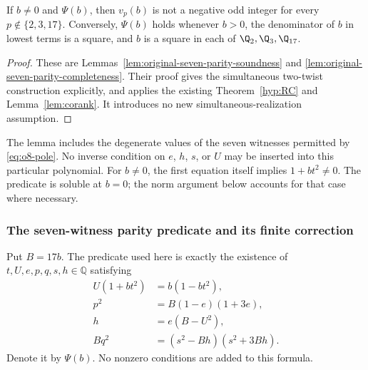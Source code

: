 \begin{lemma}\label{hyp:o8-pole}
If $b\ne0$ and $\Psi(b)$, then $v_p(b)$ is not a negative odd integer
for every $p\notin\{2,3,17\}$. Conversely, $\Psi(b)$ holds whenever
$b>0$, the denominator of $b$ in lowest terms is a square, and $b$ is
a square in each of $\Q_2,\Q_3,\Q_{17}$.
\end{lemma}
\begin{proof}
These are Lemmas~\ref{lem:original-seven-parity-soundness} and
\ref{lem:original-seven-parity-completeness}. Their proof gives the
simultaneous two-twist construction explicitly, and applies the existing
Theorem~\ref{hyp:RC} and Lemma~\ref{lem:corank}. It introduces no new
simultaneous-realization assumption.
\end{proof}

The lemma includes the degenerate values of the seven witnesses
permitted by \eqref{eq:o8-pole}. No inverse condition on $e$, $h$, $s$,
or $U$ may be inserted into this particular polynomial. For $b\ne0$,
the first equation itself implies $1+bt^2\ne0$. The predicate is soluble
at $b=0$; the norm argument below accounts for that case where necessary.

\subsubsection{The seven-witness parity predicate and its finite correction}
\label{subsec:original-seven-parity}
Put $B=17b$. The predicate used here is exactly the existence of
$t,U,e,p,q,s,h\in\mathbb Q$ satisfying
\begin{align}
 U(1+bt^2)&=b(1-bt^2),\label{eq:seven-param}\\
 p^2&=B(1-e)(1+3e),\label{eq:seven-first}\\
 h&=e(B-U^2),\label{eq:seven-h}\\
 Bq^2&=(s^2-Bh)(s^2+3Bh).\label{eq:seven-second}
\end{align}
Denote it by $\Psi(b)$. No nonzero conditions are added to this formula.

